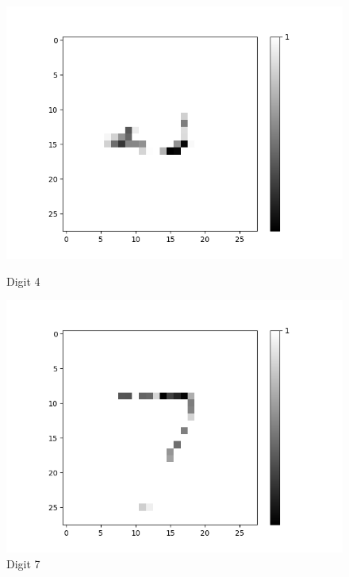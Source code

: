 \begin{figure}[H]
\begin{minipage}[b]{0.19\textwidth}
		\includegraphics[width=\textwidth]{AND-OLD(NO-LSM)/Layer0-Neuron-4.png}
		\caption{Digit 4}
	\end{minipage}
	\begin{minipage}[b]{0.19\textwidth}
		\includegraphics[width=\textwidth]{AND-OLD(NO-LSM)/Layer0-Neuron-7.png}
		\caption{Digit 7}
	\end{minipage}
	\begin{minipage}[b]{0.19\textwidth}

\end{minipage}
\end{figure}
